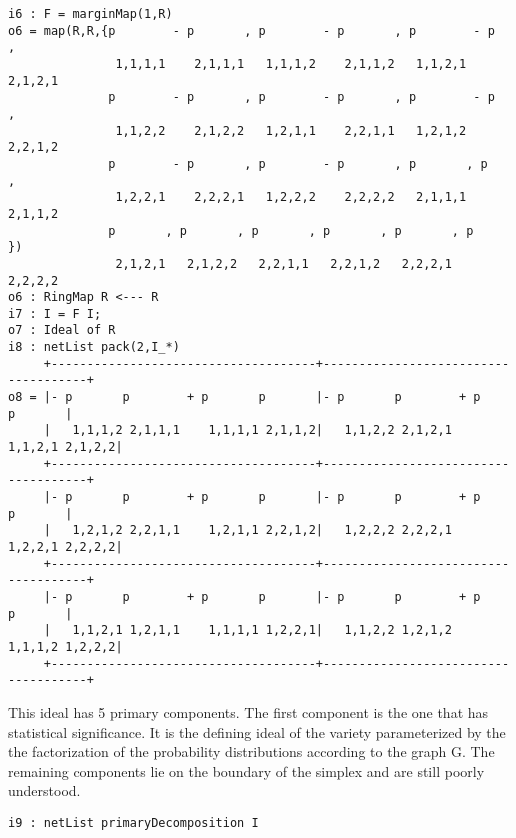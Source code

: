 \documentclass[10pt]{article}
\theoremstyle{definition}
\begin{document}
\begin{verbatim}
i6 : F = marginMap(1,R)
o6 = map(R,R,{p        - p       , p        - p       , p        - p       ,
               1,1,1,1    2,1,1,1   1,1,1,2    2,1,1,2   1,1,2,1    2,1,2,1   
              p        - p       , p        - p       , p        - p       , 
               1,1,2,2    2,1,2,2   1,2,1,1    2,2,1,1   1,2,1,2    2,2,1,2  
              p        - p       , p        - p       , p       , p       , 
               1,2,2,1    2,2,2,1   1,2,2,2    2,2,2,2   2,1,1,1   2,1,1,2  
              p       , p       , p       , p       , p       , p       })
               2,1,2,1   2,1,2,2   2,2,1,1   2,2,1,2   2,2,2,1   2,2,2,2
o6 : RingMap R <--- R
i7 : I = F I;
o7 : Ideal of R
i8 : netList pack(2,I_*)
     +-------------------------------------+-------------------------------------+
o8 = |- p       p        + p       p       |- p       p        + p       p       |
     |   1,1,1,2 2,1,1,1    1,1,1,1 2,1,1,2|   1,1,2,2 2,1,2,1    1,1,2,1 2,1,2,2|
     +-------------------------------------+-------------------------------------+
     |- p       p        + p       p       |- p       p        + p       p       |
     |   1,2,1,2 2,2,1,1    1,2,1,1 2,2,1,2|   1,2,2,2 2,2,2,1    1,2,2,1 2,2,2,2|
     +-------------------------------------+-------------------------------------+
     |- p       p        + p       p       |- p       p        + p       p       |
     |   1,1,2,1 1,2,1,1    1,1,1,1 1,2,2,1|   1,1,2,2 1,2,1,2    1,1,1,2 1,2,2,2|
     +-------------------------------------+-------------------------------------+
\end{verbatim}

This ideal has 5 primary components. The first component is the one that has statistical significance. It is the defining ideal of the variety parameterized by the the factorization of the probability distributions according to the graph G. The remaining components lie on the boundary of the simplex and are still poorly understood.

\begin{verbatim}
i9 : netList primaryDecomposition I
\end{verbatim}
\end{document}
